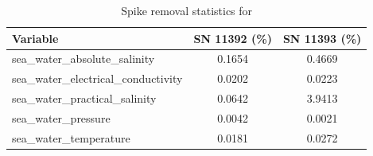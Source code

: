 \begin{table}[h]
\centering
\caption{Spike removal statistics for \projectname{} \casenumber{}}
\label{tab:spike_stats}
\begin{tabular}{|l|c|c|}
\hline
Variable & SN 11392 (\%) & SN 11393 (\%) \\
\hline
sea\_water\_absolute\_salinity & 0.1654 & 0.4669 \\
sea\_water\_electrical\_conductivity & 0.0202 & 0.0223 \\
sea\_water\_practical\_salinity & 0.0642 & 3.9413 \\
sea\_water\_pressure & 0.0042 & 0.0021 \\
sea\_water\_temperature & 0.0181 & 0.0272 \\
\hline
\end{tabular}
\end{table}
